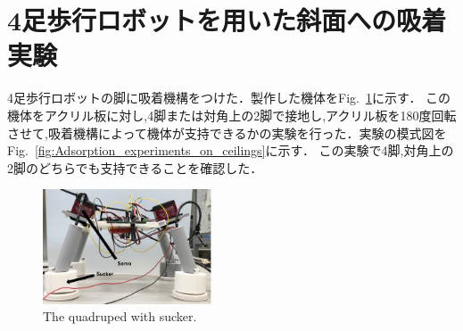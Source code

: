 \documentclass[uplatex,dvipdfmx]{jlreq}
\begin{document}
\section{4足歩行ロボットを用いた斜面への吸着実験}
4足歩行ロボットの脚に吸着機構をつけた．製作した機体をFig.~\ref{fig:The_quadruped_with_sucker.}に示す．
この機体をアクリル板に対し,4脚または対角上の2脚で接地し,アクリル板を180度回転させて,吸着機構によって機体が支持できるかの実験を行った．実験の模式図をFig.~\ref{fig:Adsorption_experiments_on_ceilings}に示す．
この実験で4脚,対角上の2脚のどちらでも支持できることを確認した．

\begin{figure}[tb]
    \centering
    \includegraphics[width=50mm]{./figure/quadruped.png}
    \caption{The quadruped with sucker.}
    \label{fig:The_quadruped_with_sucker.}
\end{figure}
\end{document}
